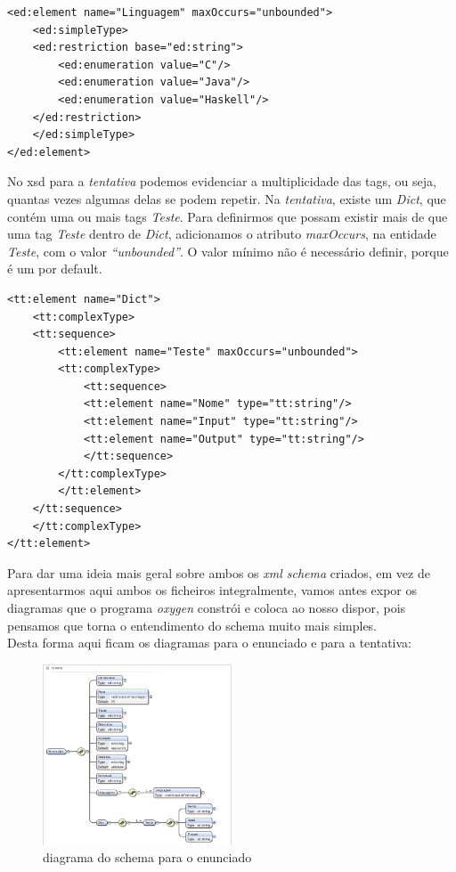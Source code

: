 \begin{lstlisting}
<ed:element name="Linguagem" maxOccurs="unbounded">
    <ed:simpleType>
	<ed:restriction base="ed:string">
	    <ed:enumeration value="C"/>
	    <ed:enumeration value="Java"/>
	    <ed:enumeration value="Haskell"/>
	</ed:restriction>
    </ed:simpleType>
</ed:element>
\end{lstlisting}


No xsd para a \textit{tentativa} podemos evidenciar a multiplicidade das tags, ou seja, quantas vezes algumas delas se podem repetir.
Na \textit{tentativa}, existe um \textit{Dict}, que contém uma ou mais tags \textit{Teste}.
Para definirmos que possam existir mais de que uma tag \textit{Teste} dentro de \textit{Dict}, adicionamos o atributo \textit{maxOccurs},
na entidade \textit{Teste}, com o valor \textit{``unbounded''}. O valor mínimo não é necessário definir, porque é um por default.
\begin{lstlisting}
<tt:element name="Dict">
    <tt:complexType>
	<tt:sequence>
	    <tt:element name="Teste" maxOccurs="unbounded">
		<tt:complexType>
		    <tt:sequence>
			<tt:element name="Nome" type="tt:string"/>
			<tt:element name="Input" type="tt:string"/>
			<tt:element name="Output" type="tt:string"/>
		    </tt:sequence>
		</tt:complexType>
	    </tt:element>
	</tt:sequence>
    </tt:complexType>
</tt:element>
\end{lstlisting}

Para dar uma ideia mais geral sobre ambos os \textit{xml schema} criados, em vez de apresentarmos aqui ambos os ficheiros integralmente,
vamos antes expor os diagramas que o programa \textit{oxygen} constrói e coloca ao nosso dispor, pois pensamos que torna o entendimento do
schema muito mais simples.\\
\newpage
Desta forma aqui ficam os diagramas para o enunciado e para a tentativa:\\
 
\begin{figure}[htbp]
\begin{center}
\includegraphics[width=0.5\textwidth]{Images/enunciado_schema}
\caption{diagrama do schema para o enunciado}\label{fig xsd enunciado}
\end{center}
\end{figure}

